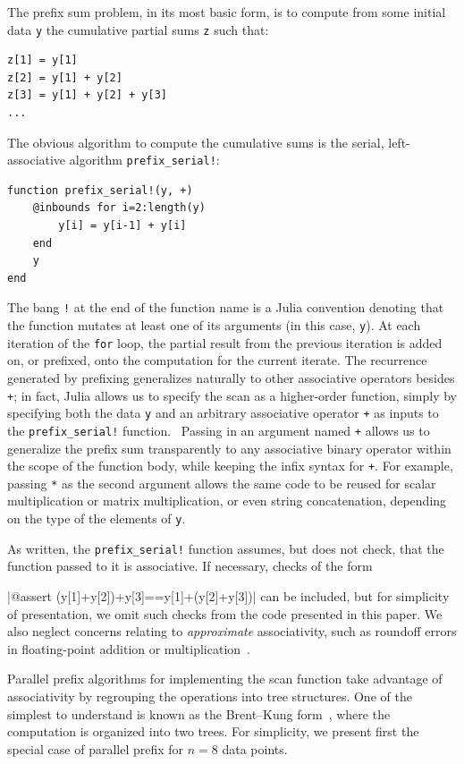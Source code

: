 \documentclass{sig-alternate}
\newcommand{\code}[1]{\texttt{#1}}
\begin{document}
The prefix sum problem, in its most basic form, is to compute from some initial
data \code{y} the cumulative partial sums \code{z} such that:

\begin{verbatim}
z[1] = y[1]
z[2] = y[1] + y[2]
z[3] = y[1] + y[2] + y[3]
...
\end{verbatim}
%
The obvious algorithm to compute the cumulative sums is the serial,
left-associative algorithm \code{prefix\allowbreak\_serial!}:

\begin{verbatim}
function prefix_serial!(y, +)
    @inbounds for i=2:length(y)
        y[i] = y[i-1] + y[i]
    end
    y
end
\end{verbatim}

The bang \code{!} at the end of the function name is a Julia convention
denoting that the function mutates at least one of its arguments (in this case,
\code{y}). At each iteration of the \code{for} loop, the partial result from
the previous iteration is added on, or prefixed, onto the computation for the
current iterate. The recurrence generated by prefixing generalizes naturally to
other associative operators besides \code{+}; in fact, Julia allows us to
specify the scan as a higher-order function, simply by specifying both the data
\code{y} and an arbitrary associative operator \code{+} as inputs to the
\code{prefix\allowbreak\_serial!} function.~\cite{Shah2013} Passing in an
argument named \code{+} allows us to generalize the prefix sum transparently to
any associative binary operator within the scope of the function body, while
keeping the infix syntax for \code{+}. For example, passing \code{*} as the
second argument allows the same code to be reused for scalar multiplication or
matrix multiplication, or even string concatenation, depending on the type of
the elements of \code{y}. 

As written, the \code{prefix\allowbreak\_serial!} function assumes, but does not check,
that the function passed to it is associative. If necessary, checks of the form

|@assert (y[1]+y[2])+y[3]==y[1]+(y[2]+y[3])|
%
can be included, but for simplicity of presentation, we omit such checks from
the code presented in this paper. We also neglect concerns relating to
\textit{approximate} associativity, such as roundoff errors in floating-point
addition or multiplication~\cite{Mathias1995}.

Parallel prefix algorithms for implementing the scan function take advantage of
associativity by regrouping the operations into tree structures. One of the
simplest to understand is known as the Brent--Kung form~\cite{Brent1982}, where
the computation is organized into two trees. For simplicity, we present first
the special case of parallel prefix for $n=8$ data points.
\end{document}

